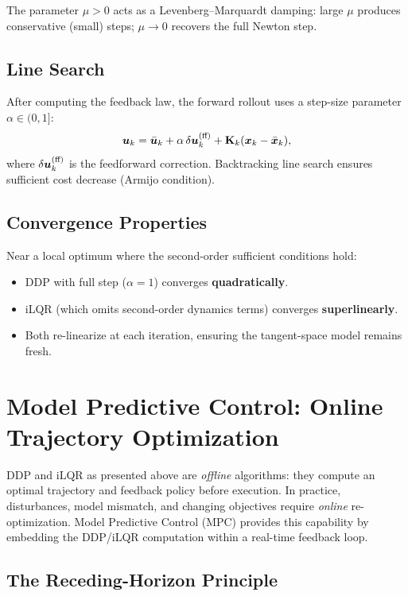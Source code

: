 The parameter $\mu > 0$ acts as a Levenberg--Marquardt damping: large $\mu$ produces conservative (small) steps;
$\mu \to 0$ recovers the full Newton step.

\subsection{Line Search}

After computing the feedback law, the forward rollout uses a step-size parameter $\alpha \in (0,1]$:
\begin{equation}
\bm{u}_k = \bar{\bm{u}}_k + \alpha\,\delta\bm{u}_k^{(\text{ff})} + \mathbf{K}_k(\bm{x}_k - \bar{\bm{x}}_k),
\label{eq:ch5:line-search}
\end{equation}
where $\delta\bm{u}_k^{(\text{ff})}$ is the feedforward correction. Backtracking line search ensures sufficient cost decrease
(Armijo condition).

\subsection{Convergence Properties}

Near a local optimum where the second-order sufficient conditions hold:
\begin{itemize}
\item DDP with full step ($\alpha = 1$) converges \textbf{quadratically}.
\item iLQR (which omits second-order dynamics terms) converges \textbf{superlinearly}.
\item Both re-linearize at each iteration, ensuring the tangent-space model remains fresh.
\end{itemize}

\section{Model Predictive Control: Online Trajectory Optimization}

DDP and iLQR as presented above are \emph{offline} algorithms: they compute an optimal
trajectory and feedback policy before execution. In practice, disturbances, model mismatch,
and changing objectives require \emph{online} re-optimization. Model Predictive Control
(MPC) provides this capability by embedding the DDP/iLQR computation within a real-time
feedback loop.

\subsection{The Receding-Horizon Principle}

